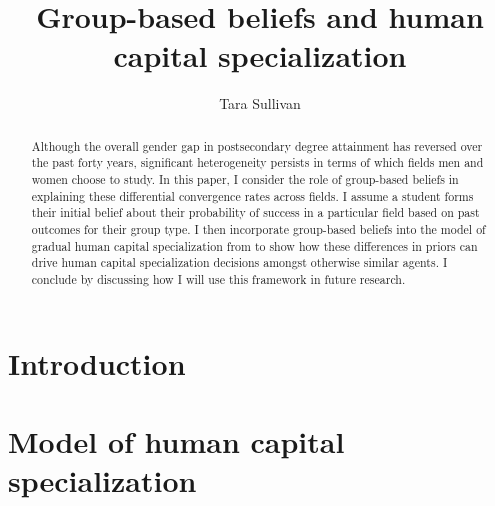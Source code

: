 \documentclass[11 pt]{article}
\newif\ifnts
\newif\iftoedit
\newcommand{\toedit}[1]{{\color{gray}#1}}
\newcommand{\toedit}[1]{#1}
\begin{document}
\title{Group-based beliefs and human capital specialization}
\author{Tara Sullivan%
}

\maketitle
\onehalfspacing

\ifnts
    Please note that gray text are notes/comments. }
\fi
\iftoedit
   \toedit{Please note that gray text are placeholders that need to be edited or checked.}
\fi

\begin{abstract}
Although the overall gender gap in postsecondary degree attainment has reversed over the past forty years, significant heterogeneity persists in terms of which fields men and women choose to study.
In this paper, I consider the role of group-based beliefs in explaining these differential convergence rates across fields. 
I assume a student forms their initial belief about their probability of success in a particular field based on past outcomes for their group type. 
I then incorporate group-based beliefs into the model of gradual human capital specialization from \textcite{AF20} to show how these differences in priors can drive human capital specialization decisions amongst otherwise similar agents.
I conclude by discussing how I will use this framework in future research.
\end{abstract}

\section{Introduction}\label{sec:intro}



\section{Model of human capital specialization}\label{sec:model}
\end{document}
